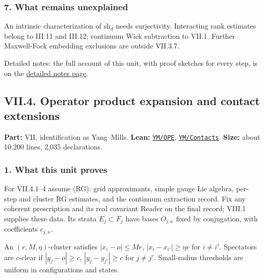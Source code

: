 \documentclass[
  letterpaper,
  11pt]{article}
\begin{document}
\subsubsection{7. What remains
unexplained}\label{what-remains-unexplained-27}

An intrinsic characterization of \(\mathrm{sh}_d\) needs surjectivity.
Interacting rank estimates belong to III.11 and III.12; continuum Wick
subtraction to VII.1. Further Maxwell-Fock embedding exclusions are
outside VII.3.7.

Detailed notes: the full account of this unit, with proof sketches for
every step, is on the
\href{https://github.com/scottnarmstrong/yang-mills-informalization/blob/main/outline/notes/VII-3.md}{detailed
notes page}.

\subsection{VII.4. Operator product expansion and contact
extensions}\label{vii.4.-operator-product-expansion-and-contact-extensions}

\textbf{Part:} VII, identification as Yang--Mills. \textbf{Lean:}
\href{https://github.com/yang-mills-group/OpenAI-YM-20261028/tree/3456e5e75cf8d4cd558955a5c7638fba2d68f464/YM/OPE}{\texttt{YM/OPE}},
\href{https://github.com/yang-mills-group/OpenAI-YM-20261028/tree/3456e5e75cf8d4cd558955a5c7638fba2d68f464/YM/Contacts}{\texttt{YM/Contacts}}.
\textbf{Size:} about 10,200 lines, 2,035 declarations.

\subsubsection{1. What this unit proves}\label{what-this-unit-proves-28}

For VII.4.1--4 assume (RG): grid approximants, simple gauge Lie algebra,
per-step and cluster RG estimates, and the continuum extraction record.
Fix any coherent prescription and its real covariant Reader on the final
record; VIII.1 supplies these data. Its strata \(E_j\subset F_j\) have
bases \(O_{j,\kappa}\) fixed by conjugation, with coefficients
\(c_{j,\kappa}\).

An \((r,M,\eta)\)-cluster satisfies \(|x_i-o|\le Mr\),
\(|x_i-x_{i'}|\ge\eta r\) for \(i\ne i'\). Spectators are \(c\)-clear if
\(|y_j-o|\ge c\), \(|y_j-y_{j'}|\ge c\) for \(j\ne j'\). Small-radius
thresholds are uniform in configurations and states.
\end{document}
